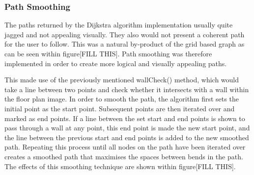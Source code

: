 \documentclass[main.tex]{subfiles}
\begin{document}
\subsubsection{Path Smoothing}

The paths returned by the Dijkstra algorithm implementation usually quite jagged and not appealing visually. They also would not present a coherent path for the user to follow. This was a natural by-product of the grid based graph as can be seen within figure[FILL THIS]. Path smoothing was therefore implemented in order to create more logical and visually appealing paths.

This made use of the previously mentioned wallCheck() method, which would take a line between two points and check whether it intersects with a wall within the floor plan image. In order to smooth the path, the algorithm first sets the initial point as the start point. Subsequent points are then iterated over and marked as end points. If a line between the set start and end points is shown to pass through a wall at any point, this end point is made the new start point, and the line between the previous start and end points is added to the new smoothed path. Repeating this process until all nodes on the path have been iterated over creates a smoothed path that maximises the spaces between bends in the path. The effects of this smoothing technique are shown within figure[FILL THIS].
\end{document}
